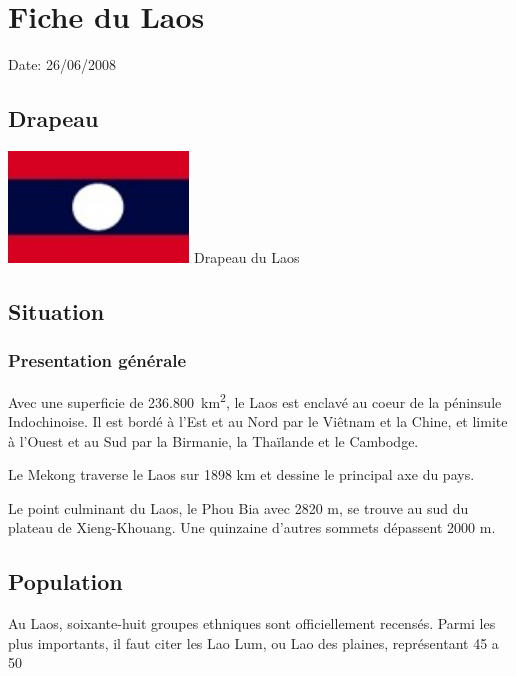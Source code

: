 \section{Fiche du Laos}

Date: 26/06/2008

\begin{multicols}{2}

\subsection{Drapeau}

\hspace*{-0.65cm}
\includegraphics[width=4.8cm]{articles/Fiche-du-laos/1214470058Q382.jpg}
Drapeau du Laos


\subsection{Situation}
\subsubsection{Presentation générale}

Avec une superficie de \SI{236.800}{km^2}, le Laos est enclavé au coeur de la péninsule Indochinoise. Il est bordé à l’Est et au Nord par le Viêtnam et la Chine, et limite à l’Ouest et au Sud par la Birmanie, la Thaïlande et le Cambodge.

Le Mekong traverse le Laos sur 1898 km et dessine le principal axe du pays.

Le point culminant du Laos, le Phou Bia avec 2820 m, se trouve au sud du plateau de Xieng-Khouang. Une quinzaine d’autres sommets dépassent 2000 m.

\subsection{Population}

Au Laos, soixante-huit groupes ethniques sont officiellement recensés. Parmi les plus importants, il faut citer les Lao Lum, ou Lao des plaines, représentant 45 a 50%


\end{multicols}
